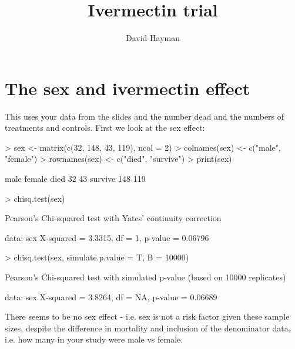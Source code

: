 \documentclass{article}
\begin{document}


\title{Ivermectin trial}
\author{David Hayman}





\maketitle


\section{The sex and ivermectin effect}

This uses your data from the slides and the number dead and the numbers of treatments and controls. First we look at the sex effect:

\begin{Schunk}
\begin{Sinput}
> sex <- matrix(c(32, 148, 43, 119), ncol = 2)
> colnames(sex) <- c("male", "female")
> rownames(sex) <- c("died", "survive")
> print(sex)
\end{Sinput}
\begin{Soutput}
        male female
died      32     43
survive  148    119
\end{Soutput}
\begin{Sinput}
> chisq.test(sex)
\end{Sinput}
\begin{Soutput}
	Pearson's Chi-squared test with Yates' continuity correction

data:  sex
X-squared = 3.3315, df = 1, p-value = 0.06796
\end{Soutput}
\begin{Sinput}
> chisq.test(sex, simulate.p.value = T, B = 10000)
\end{Sinput}
\begin{Soutput}
	Pearson's Chi-squared test with simulated p-value (based on 10000
	replicates)

data:  sex
X-squared = 3.8264, df = NA, p-value = 0.06689
\end{Soutput}
\end{Schunk}

There seems to be no sex effect - i.e. sex is not a risk factor given these sample sizes, despite the difference in mortality and inclusion of the denominator data, i.e. how many in your study were male vs female.
\end{document}

